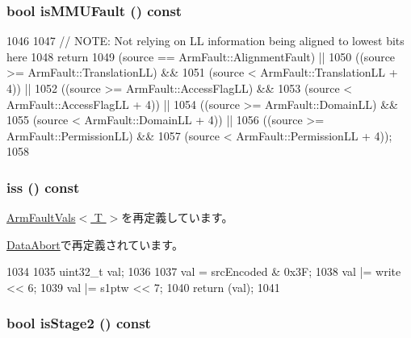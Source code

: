\hypertarget{classArmISA_1_1AbortFault_a3839d4e20c8314337d02889689f3c57e}{
\subsubsection[{isMMUFault}]{\setlength{\rightskip}{0pt plus 5cm}bool isMMUFault () const}}
\label{classArmISA_1_1AbortFault_a3839d4e20c8314337d02889689f3c57e}



\begin{DoxyCode}
1046 {
1047     // NOTE: Not relying on LL information being aligned to lowest bits here
1048     return
1049          (source == ArmFault::AlignmentFault)     ||
1050         ((source >= ArmFault::TranslationLL) &&
1051          (source <  ArmFault::TranslationLL + 4)) ||
1052         ((source >= ArmFault::AccessFlagLL) &&
1053          (source <  ArmFault::AccessFlagLL + 4))  ||
1054         ((source >= ArmFault::DomainLL) &&
1055          (source <  ArmFault::DomainLL + 4))      ||
1056         ((source >= ArmFault::PermissionLL) &&
1057          (source <  ArmFault::PermissionLL + 4));
1058 }
\end{DoxyCode}
\hypertarget{classArmISA_1_1AbortFault_a54f4d33ac162a95fd5b3830cf7fab8ff}{
\subsubsection[{iss}]{ iss () const}}
\label{classArmISA_1_1AbortFault_a54f4d33ac162a95fd5b3830cf7fab8ff}


\hyperlink{classArmISA_1_1ArmFaultVals_a1049bf31f8df10c66994603055cf531d}{ArmFaultVals$<$ T $>$}を再定義しています。

\hyperlink{classArmISA_1_1DataAbort_a54f4d33ac162a95fd5b3830cf7fab8ff}{DataAbort}で再定義されています。


\begin{DoxyCode}
1034 {
1035     uint32_t val;
1036 
1037     val  = srcEncoded & 0x3F;
1038     val |= write << 6;
1039     val |= s1ptw << 7;
1040     return (val);
1041 }
\end{DoxyCode}
\hypertarget{classArmISA_1_1AbortFault_abb0e34fd2d22460e7779f419601dc6dc}{
\subsubsection[{isStage2}]{\setlength{\rightskip}{0pt plus 5cm}bool isStage2 () const}}
\label{classArmISA_1_1AbortFault_abb0e34fd2d22460e7779f419601dc6dc}


